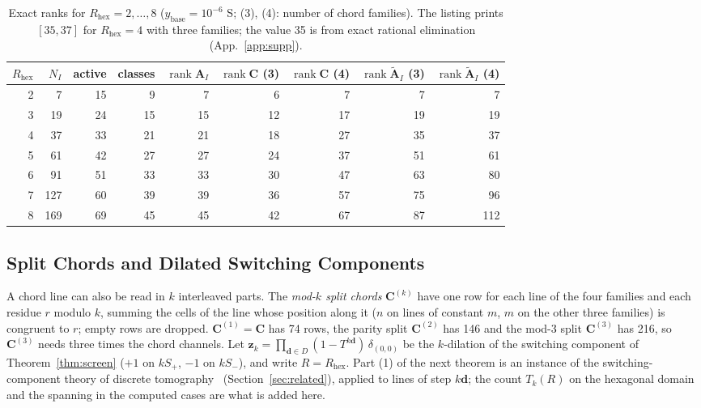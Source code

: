 \documentclass[11pt,a4paper]{article}
\theoremstyle{definition}
\theoremstyle{remark}
\begin{document}
\begin{table}[h!]\centering\small
\begin{tabular}{@{}rrrrrrrrr@{}}
\toprule
$R_{\text{hex}}$ & $N_I$ & active & classes & $\operatorname{rank}\mathbf{A}_I$ & $\operatorname{rank}\mathbf{C}$ (3) & $\operatorname{rank}\mathbf{C}$ (4) & $\operatorname{rank}\widetilde{\mathbf{A}}_I$ (3) & $\operatorname{rank}\widetilde{\mathbf{A}}_I$ (4) \\
\midrule
2 & 7 & 15 & 9 & 7 & 6 & 7 & 7 & 7 \\
3 & 19 & 24 & 15 & 15 & 12 & 17 & 19 & 19 \\
4 & 37 & 33 & 21 & 21 & 18 & 27 & 35 & 37 \\
5 & 61 & 42 & 27 & 27 & 24 & 37 & 51 & 61 \\
6 & 91 & 51 & 33 & 33 & 30 & 47 & 63 & 80 \\
7 & 127 & 60 & 39 & 39 & 36 & 57 & 75 & 96 \\
8 & 169 & 69 & 45 & 45 & 42 & 67 & 87 & 112 \\
\bottomrule
\end{tabular}
\caption{Exact ranks for $R_{\text{hex}} = 2,\dots,8$ ($y_{\text{base}} = 10^{-6}$ S; (3), (4): number of chord families). The listing prints $[35,37]$ for $R_{\text{hex}} = 4$ with three families; the value 35 is from exact rational elimination (App.~\ref{app:supp}).}\label{tab:family}
\end{table}

\subsection{Split Chords and Dilated Switching Components}\label{sec:split}
A chord line can also be read in $k$ interleaved parts. The \emph{mod-$k$ split chords} $\mathbf{C}^{(k)}$ have one row for each line of the four families and each residue $r$ modulo $k$, summing the cells of the line whose position along it ($n$ on lines of constant $m$, $m$ on the other three families) is congruent to $r$; empty rows are dropped. $\mathbf{C}^{(1)} = \mathbf{C}$ has 74 rows, the parity split $\mathbf{C}^{(2)}$ has 146 and the mod-3 split $\mathbf{C}^{(3)}$ has 216, so $\mathbf{C}^{(3)}$ needs three times the chord channels. Let $\mathbf{z}_k = \prod_{\mathbf{d}\in D}(1-T^{k\mathbf{d}})\,\delta_{(0,0)}$ be the $k$-dilation of the switching component of Theorem~\ref{thm:screen} ($+1$ on $kS_+$, $-1$ on $kS_-$), and write $R = R_{\text{hex}}$. Part (1) of the next theorem is an instance of the switching-component theory of discrete tomography~\cite{hajdu2001} (Section~\ref{sec:related}), applied to lines of step $k\mathbf{d}$; the count $T_k(R)$ on the hexagonal domain and the spanning in the computed cases are what is added here.
\end{document}
